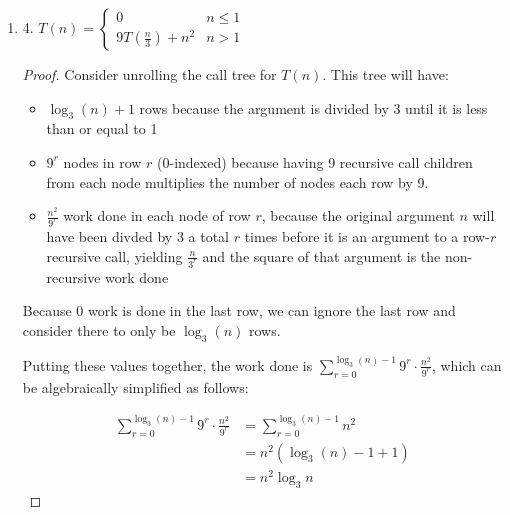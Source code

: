 \documentclass[10pt]{article}
\begin{document}
\begin{enumerate}[label={}]
\begin{proof}
                  Since the total work $\frac{3}{2} \cdot n^{\log _3 5}-\frac{3 n}{2}$ is always less than or equal to $\frac{3}{2} \cdot n^{\log _3 5}$ for $n \geq 1$, it follows that $T(n)=\frac{3}{2} \cdot n^{\log _3 5}-\frac{3 n}{2} \in O\left(n^{\log _3 5}\right)$.

            \end{proof}


            \newpage


      \item 4. $T(n)= \begin{cases}0 & n \leq 1 \\ 9 T\left(\frac{n}{3}\right)+n^2 & n>1\end{cases}$

            \begin{proof}
                  Consider unrolling the call tree for $T(n)$. This tree will have:
                  \begin{itemize}
                        \item $\log _3(n)+1$ rows because the argument is divided by 3 until it is less than or equal to 1
                        \item $9^r$ nodes in row $r$ (0-indexed) because having 9 recursive call children from each node multiplies the number of nodes each row by 9.
                        \item $\frac{n^2}{9^r}$ work done in each node of row $r$, because the original argument $n$ will have been divded by 3 a total $r$ times before it is an argument to a row-$r$ recursive call, yielding $\frac{n}{3^r}$ and the square of that argument is the non-recursive work done
                  \end{itemize}
                  Because 0 work is done in the last row, we can ignore the last row and consider there to only be $\log _3(n)$ rows.

                  Putting these values together, the work done is $\sum_{r=0}^{\log _3(n)-1} 9^r \cdot \frac{n^2}{9^r}$, which can be algebraically simplified as follows:

                  $$
                        \begin{aligned}
                              \sum_{r=0}^{\log _3 (n)-1} 9^r \cdot \frac{n^2}{9^r} & =\sum_{r=0}^{\log _3 (n)-1}n^2   \\
                                                                                   & =n^2\left(\log _3 (n)-1+1\right) \\
                                                                                   & =n^2 \log _3 n
                        \end{aligned}
                  $$



\end{proof}
\end{enumerate}
\end{document}
